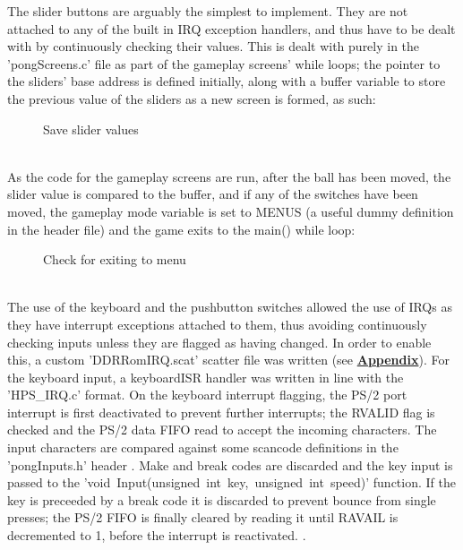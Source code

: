 \documentclass[a4paper,12pt]{article}
\begin{document}
\begin{flushleft}
The slider buttons are arguably the simplest to implement. They are not attached to any of the built in IRQ exception handlers, and thus have to be dealt with by continuously checking their values. This is dealt with purely in the 'pongScreens.c' file as part of the gameplay screens' while loops; the pointer to the sliders' base address is defined initially, along with a buffer variable to store the previous value of the sliders as a new screen is formed, as such:
\begin{figure}[H]
	
	\caption{Save slider values}
\end{figure}
\- \\
As the code for the gameplay screens are run, after the ball has been moved, the slider value is compared to the buffer, and if any of the switches have been moved, the gameplay mode variable is set to MENUS (a useful dummy definition in the header file) and the game exits to the main() while loop:
\begin{figure}[H]
	
	\caption{Check for exiting to menu}
\end{figure}
\- \\
The use of the keyboard and the pushbutton switches allowed the use of IRQs as they have interrupt exceptions attached to them, thus avoiding continuously checking inputs unless they are flagged as having changed. In order to enable this, a custom 'DDRRomIRQ.scat' scatter file was written (see \textbf{\hyperref[section:appendix]{Appendix}}). For the keyboard input, a keyboardISR handler was written in line with the 'HPS\_IRQ.c' format. On the keyboard interrupt flagging, the PS/2 port interrupt is first deactivated to prevent further interrupts; the RVALID flag is checked and the PS/2 data FIFO read \cite{altera_2014} to accept the incoming characters. The input characters are compared against some scancode definitions in the 'pongInputs.h' header \cite{altium_ps2}. Make and break codes are discarded and the key input is passed to the \mbox{'void Input(unsigned int key, unsigned int speed)'} function. If the key is preceeded by a break code it is discarded to prevent bounce from single presses; the PS/2 FIFO is finally cleared by reading it until RAVAIL is decremented to 1, before the interrupt is reactivated. \cite{altera_2014}.
\\ \- \\

\end{flushleft}
\end{document}
